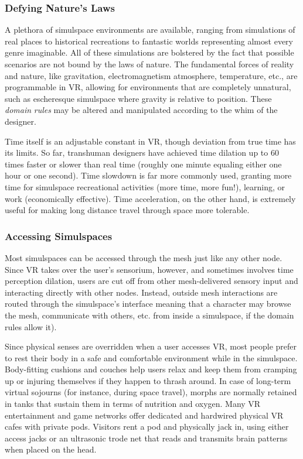 \subsubsection{Defying Nature's Laws} 

A plethora of simulspace environments are available, ranging from simulations of real places to historical recreations to fantastic worlds representing almost every genre imaginable. All of these simulations are bolstered by the fact that possible scenarios are not bound by the laws of nature. The fundamental forces of reality and nature, like gravitation, electromagnetism atmosphere, temperature, etc., are programmable in VR, allowing for environments that are completely unnatural, such as escheresque simulspace where gravity is relative to position. These \textit{domain } \textit{rules} may be altered and manipulated according to the whim of the designer. 

Time itself is an adjustable constant in VR, though deviation from true time has its limits. So far, transhuman designers have achieved time dilation up to 60 times faster or slower than real time (roughly one minute equaling either one hour or one second). Time slowdown is far more commonly used, granting more time for simulspace recreational activities (more time, more fun!), learning, or work (economically effective). Time acceleration, on the other hand, is extremely useful for making long distance travel through space more tolerable. 

\subsubsection{Accessing Simulspaces} 

Most simulspaces can be accessed through the mesh just like any other node. Since VR takes over the user's sensorium, however, and sometimes involves time perception dilation, users are cut off from other mesh-delivered sensory input and interacting directly with other nodes. Instead, outside mesh interactions are routed through the simulspace's interface meaning that a character may browse the mesh, communicate with others, etc. from inside a simulspace, if the domain rules allow it). 

Since physical senses are overridden when a user accesses VR, most people prefer to rest their body in a safe and comfortable environment while in the simulspace. Body-fitting cushions and couches help users relax and keep them from cramping up or injuring themselves if they happen to thrash around. In case of long-term virtual sojourns (for instance, during space travel), morphs are normally retained in tanks that sustain them in terms of nutrition and oxygen. Many VR entertainment and game networks offer dedicated and hardwired physical VR cafes with private pods. Visitors rent a pod and physically jack in, using either access jacks or an ultrasonic trode net that reads and transmits brain patterns when placed on the head. 


